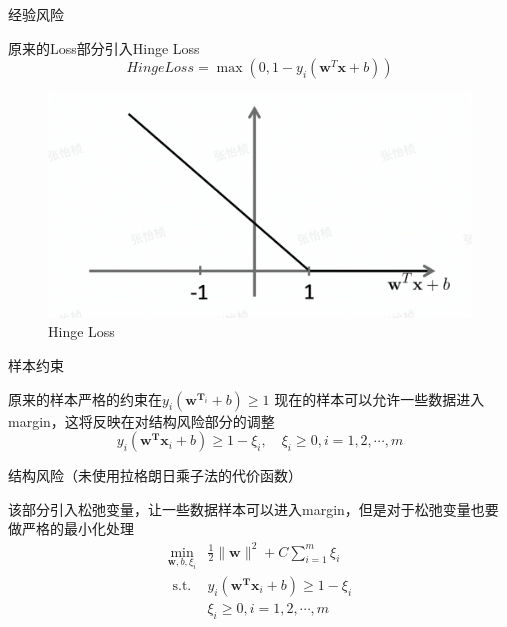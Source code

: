 \begin{outline}

	
	\1 经验风险

	原来的Loss部分引入Hinge Loss
	\begin{equation}
		Hinge Loss=\max \left(0,1-y_{i}\left(\boldsymbol{w}^{T} \boldsymbol{x}+b\right)\right)
	\end{equation}

	\begin{figure}[h]%
		\centering
		\includegraphics[scale=0.5]{figs/4.png} 
		\caption{Hinge Loss}
		\label{fig:Hinge}
	 \end{figure}

	 \1 样本约束

	 原来的样本严格的约束在$y_{i}\left(\mathbf{w}^{\mathbf{T}_{i}}+b\right) \geqslant 1$
	 现在的样本可以允许一些数据进入margin，这将反映在对结构风险部分的调整
	 \begin{equation}
		y_{i}\left(\mathbf{w}^{\mathbf{T}} \mathbf{x}_{i}+b\right) \geqslant 1-\xi_{i}, \quad \xi_{i} \geq 0, i=1,2, \cdots, m
	 \end{equation}

	 \1 结构风险（未使用拉格朗日乘子法的代价函数）
	
	 该部分引入松弛变量，让一些数据样本可以进入margin，但是对于松弛变量也要做严格的最小化处理
	 \begin{equation}
		 \begin{array}{ll}
			 \min _{\mathbf{w}, b, \xi_{i}} & \frac{1}{2}\|\mathbf{w}\|^{2}+C \sum_{i=1}^{m} \xi_{i} \\
			 \text { s.t. } & y_{i}\left(\mathbf{w}^{\mathbf{T}} \mathbf{x}_{i}+b\right) \geqslant 1-\xi_{i} \\
			 & \xi_{i} \geqslant 0, i=1,2, \cdots, m
			 \end{array}
	 \end{equation}


\end{outline}
